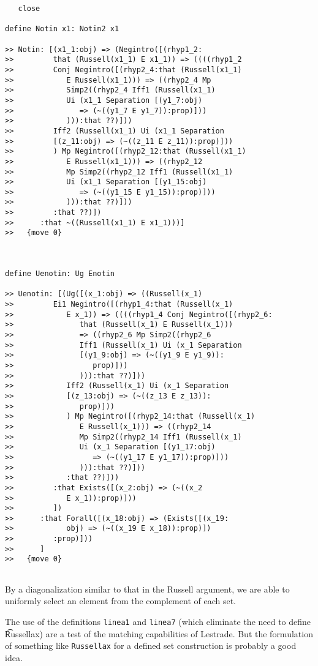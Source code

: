 \documentclass[12pt]{article}
\begin{document}
\begin{verbatim}
   close

define Notin x1: Notin2 x1

>> Notin: [(x1_1:obj) => (Negintro([(rhyp1_2:
>>         that (Russell(x1_1) E x1_1)) => ((((rhyp1_2
>>         Conj Negintro([(rhyp2_4:that (Russell(x1_1)
>>            E Russell(x1_1))) => ((rhyp2_4 Mp
>>            Simp2((rhyp2_4 Iff1 (Russell(x1_1)
>>            Ui (x1_1 Separation [(y1_7:obj)
>>               => (~((y1_7 E y1_7)):prop)]))
>>            ))):that ??)]))
>>         Iff2 (Russell(x1_1) Ui (x1_1 Separation
>>         [(z_11:obj) => (~((z_11 E z_11)):prop)]))
>>         ) Mp Negintro([(rhyp2_12:that (Russell(x1_1)
>>            E Russell(x1_1))) => ((rhyp2_12
>>            Mp Simp2((rhyp2_12 Iff1 (Russell(x1_1)
>>            Ui (x1_1 Separation [(y1_15:obj)
>>               => (~((y1_15 E y1_15)):prop)]))
>>            ))):that ??)]))
>>         :that ??)])
>>      :that ~((Russell(x1_1) E x1_1)))]
>>   {move 0}



define Uenotin: Ug Enotin

>> Uenotin: [(Ug([(x_1:obj) => ((Russell(x_1)
>>         Ei1 Negintro([(rhyp1_4:that (Russell(x_1)
>>            E x_1)) => ((((rhyp1_4 Conj Negintro([(rhyp2_6:
>>               that (Russell(x_1) E Russell(x_1)))
>>               => ((rhyp2_6 Mp Simp2((rhyp2_6
>>               Iff1 (Russell(x_1) Ui (x_1 Separation
>>               [(y1_9:obj) => (~((y1_9 E y1_9)):
>>                  prop)]))
>>               ))):that ??)]))
>>            Iff2 (Russell(x_1) Ui (x_1 Separation
>>            [(z_13:obj) => (~((z_13 E z_13)):
>>               prop)]))
>>            ) Mp Negintro([(rhyp2_14:that (Russell(x_1)
>>               E Russell(x_1))) => ((rhyp2_14
>>               Mp Simp2((rhyp2_14 Iff1 (Russell(x_1)
>>               Ui (x_1 Separation [(y1_17:obj)
>>                  => (~((y1_17 E y1_17)):prop)]))
>>               ))):that ??)]))
>>            :that ??)]))
>>         :that Exists([(x_2:obj) => (~((x_2
>>            E x_1)):prop)]))
>>         ])
>>      :that Forall([(x_18:obj) => (Exists([(x_19:
>>            obj) => (~((x_19 E x_18)):prop)])
>>         :prop)]))
>>      ]
>>   {move 0}


\end{verbatim}

By a diagonalization similar to that in the Russell argument, we are able to uniformly select an element from the complement of each set.

The use of the definitions {\tt linea1} and {\tt linea7} (which eliminate the need to define {\t Russellax}) are a test of the matching capabilities of Lestrade.  But the formulation of something like {\tt Russellax} for a defined set construction is probably a good idea.
\end{document}
